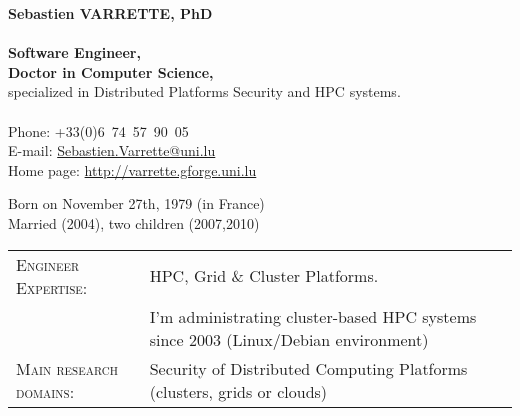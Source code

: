 \documentclass{cv}
\begin{document}
\begin{chapeau}
    \begin{adresse}
        {\Large\textbf{Sebastien VARRETTE, PhD}}\\
        \ligne\\
        \textbf{Software Engineer,}\\
        \textbf{Doctor in Computer Science,}\\
        specialized in Distributed Platforms Security and HPC systems.\\
        \ligne\\
        Phone: +33(0)6~74~57~90~05\\
        E-mail:    \url{Sebastien.Varrette@uni.lu}\\
        Home page: \url{http://varrette.gforge.uni.lu}
    \end{adresse}
    \begin{etatcivil}

        Born on November 27th, 1979 (in France)\\
        Married (2004), two children (2007,2010)\\
    \end{etatcivil}
\end{chapeau}

\vspace{1.6em}
\begin{tabular}{ll}
    \textsc{Engineer Expertise:} & \acf{HPC}, Grid \& Cluster Platforms.
    \\
    & \hfill I'm administrating cluster-based \ac{HPC} systems since 2003
    (Linux/Debian environment)
    \\
    \textsc{Main research domains}: & Security of Distributed Computing
    Platforms (clusters, grids or clouds)
\end{tabular}









\clearpage




\end{document}
